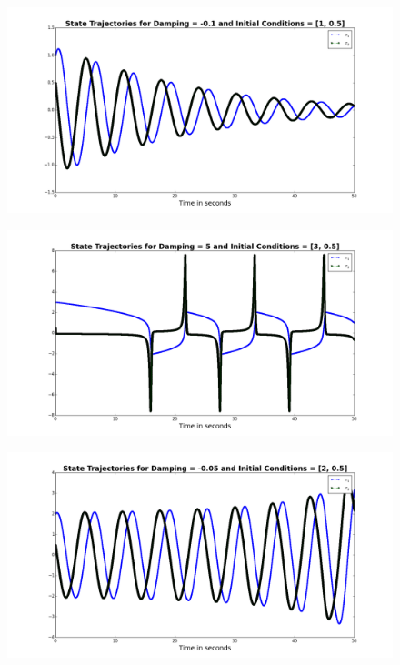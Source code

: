 \documentclass[11pt]{article}
\begin{document}
\begin{figure}[H]
\centering
\includegraphics[scale=0.35]{../output/vanderpol_trajectories0}
\end{figure}
\begin{figure}[H]
\centering
\includegraphics[scale=0.35]{../output/vanderpol_trajectories1}
\end{figure}
\begin{figure}[H]
\centering
\includegraphics[scale=0.35]{../output/vanderpol_trajectories2}
\end{figure}
\end{document}
